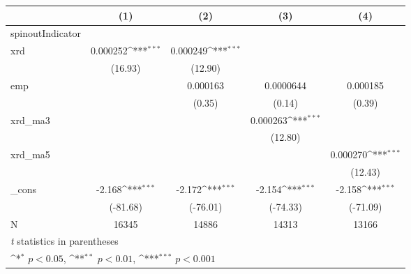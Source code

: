 {
\def\sym#1{\ifmmode^{#1}\else\(^{#1}\)\fi}
\begin{tabular}{l*{4}{c}}
\hline\hline
            &\multicolumn{1}{c}{(1)}         &\multicolumn{1}{c}{(2)}         &\multicolumn{1}{c}{(3)}         &\multicolumn{1}{c}{(4)}         \\
\hline
spinoutIndicator&                     &                     &                     &                     \\
xrd         &    0.000252\sym{***}&    0.000249\sym{***}&                     &                     \\
            &     (16.93)         &     (12.90)         &                     &                     \\
[1em]
emp         &                     &    0.000163         &   0.0000644         &    0.000185         \\
            &                     &      (0.35)         &      (0.14)         &      (0.39)         \\
[1em]
xrd\_ma3     &                     &                     &    0.000263\sym{***}&                     \\
            &                     &                     &     (12.80)         &                     \\
[1em]
xrd\_ma5     &                     &                     &                     &    0.000270\sym{***}\\
            &                     &                     &                     &     (12.43)         \\
[1em]
\_cons      &      -2.168\sym{***}&      -2.172\sym{***}&      -2.154\sym{***}&      -2.158\sym{***}\\
            &    (-81.68)         &    (-76.01)         &    (-74.33)         &    (-71.09)         \\
\hline
N           &       16345         &       14886         &       14313         &       13166         \\
\hline\hline
\multicolumn{5}{l}{\footnotesize \textit{t} statistics in parentheses}\\
\multicolumn{5}{l}{\footnotesize \sym{*} \(p<0.05\), \sym{**} \(p<0.01\), \sym{***} \(p<0.001\)}\\
\end{tabular}
}
